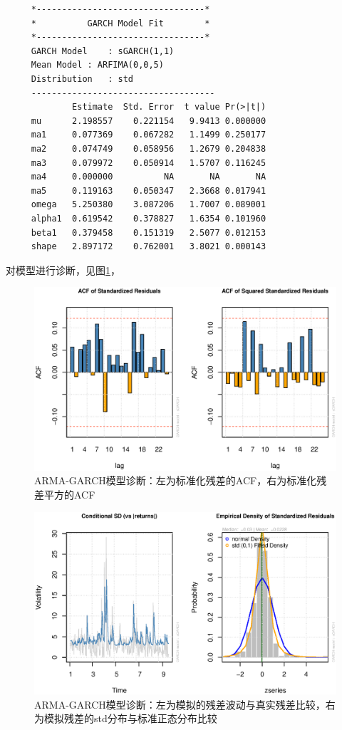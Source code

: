 \begin{framed}
	\begin{verbatim}
	 *---------------------------------*                         
	 *          GARCH Model Fit        *                           
	 *---------------------------------*
	 GARCH Model	: sGARCH(1,1)
	 Mean Model	: ARFIMA(0,0,5)
	 Distribution	: std 
	 ------------------------------------
	         Estimate  Std. Error  t value Pr(>|t|)
	 mu      2.198557    0.221154   9.9413 0.000000                                  
	 ma1     0.077369    0.067282   1.1499 0.250177
	 ma2     0.074749    0.058956   1.2679 0.204838
	 ma3     0.079972    0.050914   1.5707 0.116245
	 ma4     0.000000          NA       NA       NA
	 ma5     0.119163    0.050347   2.3668 0.017941
	 omega   5.250380    3.087206   1.7007 0.089001
	 alpha1  0.619542    0.378827   1.6354 0.101960
	 beta1   0.379458    0.151319   2.5077 0.012153
	 shape   2.897172    0.762001   3.8021 0.000143
	\end{verbatim}
\end{framed}
对模型进行诊断，见图\ref{fig:diagarch}，
\begin{figure}[h!]
	\centering
	\includegraphics[width=0.7\linewidth]{pic/ast/diagarch}
	\caption{ARMA-GARCH模型诊断：左为标准化残差的ACF，右为标准化残差平方的ACF}
	\label{fig:diagarch}
\end{figure}
\begin{figure}[h!]
	\centering
	\includegraphics[width=0.6\linewidth]{pic/ast/diav}
	\caption{ARMA-GARCH模型诊断：左为模拟的残差波动与真实残差比较，右为模拟残差的std分布与标准正态分布比较}
	\label{fig:diav}
\end{figure}
